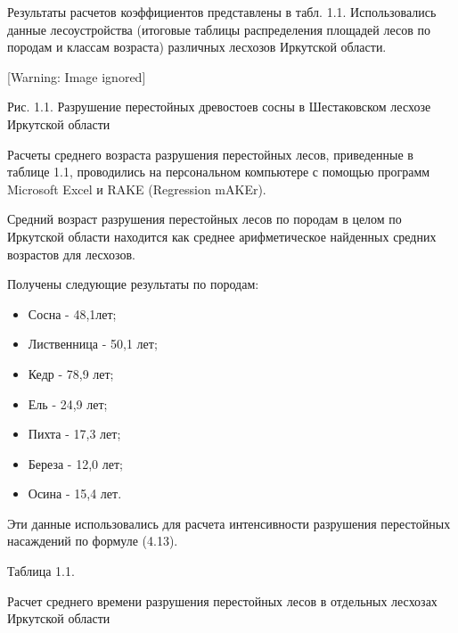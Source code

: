 \documentclass{report}
\begin{document}
Результаты расчетов коэффициентов представлены в табл. 1.1. Использовались данные лесоустройства (итоговые таблицы
распределения площадей лесов по породам и классам возраста) различных лесхозов Иркутской области.

  [Warning: Image ignored] %
 

Рис. 1.1. Разрушение перестойных древостоев сосны в Шестаковском лесхозе Иркутской области

Расчеты среднего возраста разрушения перестойных лесов, приведенные в таблице 1.1, проводились на персональном
компьютере с помощью программ Microsoft Excel и RAKE (Regression mAKEr). 

Средний возраст разрушения перестойных лесов по породам в целом по Иркутской области находится как среднее
арифметическое найденных средних возрастов для лесхозов.

Получены следующие результаты по породам:  

\begin{itemize}
\item Сосна - 48,1лет;
\item Лиственница - 50,1 лет;
\item Кедр - 78,9 лет;
\item Ель - 24,9 лет;
\item Пихта - 17,3 лет;
\item Береза - 12,0 лет;
\item Осина - 15,4 лет.
\end{itemize}
Эти данные использовались для расчета интенсивности разрушения перестойных насаждений по формуле (4.13).

Таблица 1.1. 

Расчет среднего времени разрушения перестойных лесов в отдельных лесхозах Иркутской области
\end{document}
